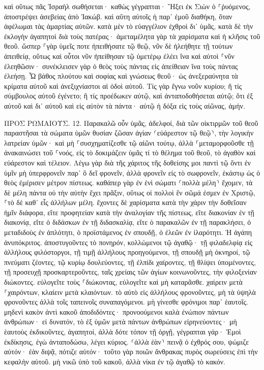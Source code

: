 \documentclass[twoside, 9pt]{extreport}
\begin{document}
καὶ οὕτως πᾶς Ἰσραὴλ σωθήσεται· καθὼς γέγραπται· Ἥξει ἐκ Σιὼν ὁ ⸀ῥυόμενος, ἀποστρέψει ἀσεβείας ἀπὸ Ἰακώβ. 
καὶ αὕτη αὐτοῖς ἡ παρ᾽ ἐμοῦ διαθήκη, ὅταν ἀφέλωμαι τὰς ἁμαρτίας αὐτῶν. 
κατὰ μὲν τὸ εὐαγγέλιον ἐχθροὶ δι᾽ ὑμᾶς, κατὰ δὲ τὴν ἐκλογὴν ἀγαπητοὶ διὰ τοὺς πατέρας· 
ἀμεταμέλητα γὰρ τὰ χαρίσματα καὶ ἡ κλῆσις τοῦ θεοῦ. 
ὥσπερ ⸀γὰρ ὑμεῖς ποτε ἠπειθήσατε τῷ θεῷ, νῦν δὲ ἠλεήθητε τῇ τούτων ἀπειθείᾳ, 
οὕτως καὶ οὗτοι νῦν ἠπείθησαν τῷ ὑμετέρῳ ἐλέει ἵνα καὶ αὐτοὶ ⸀νῦν ἐλεηθῶσιν· 
συνέκλεισεν γὰρ ὁ θεὸς τοὺς πάντας εἰς ἀπείθειαν ἵνα τοὺς πάντας ἐλεήσῃ. 
Ὦ βάθος πλούτου καὶ σοφίας καὶ γνώσεως θεοῦ· ὡς ἀνεξεραύνητα τὰ κρίματα αὐτοῦ καὶ ἀνεξιχνίαστοι αἱ ὁδοὶ αὐτοῦ. 
Τίς γὰρ ἔγνω νοῦν κυρίου; ἢ τίς σύμβουλος αὐτοῦ ἐγένετο; 
ἢ τίς προέδωκεν αὐτῷ, καὶ ἀνταποδοθήσεται αὐτῷ; 
ὅτι ἐξ αὐτοῦ καὶ δι᾽ αὐτοῦ καὶ εἰς αὐτὸν τὰ πάντα· αὐτῷ ἡ δόξα εἰς τοὺς αἰῶνας, ἀμήν. 

ΠΡΟΣ ΡΩΜΑΙΟΥΣ.
12.
Παρακαλῶ οὖν ὑμᾶς, ἀδελφοί, διὰ τῶν οἰκτιρμῶν τοῦ θεοῦ παραστῆσαι τὰ σώματα ὑμῶν θυσίαν ζῶσαν ἁγίαν ⸂εὐάρεστον τῷ θεῷ⸃, τὴν λογικὴν λατρείαν ὑμῶν· 
καὶ μὴ ⸀συσχηματίζεσθε τῷ αἰῶνι τούτῳ, ἀλλὰ ⸀μεταμορφοῦσθε τῇ ἀνακαινώσει τοῦ ⸀νοός, εἰς τὸ δοκιμάζειν ὑμᾶς τί τὸ θέλημα τοῦ θεοῦ, τὸ ἀγαθὸν καὶ εὐάρεστον καὶ τέλειον. 
Λέγω γὰρ διὰ τῆς χάριτος τῆς δοθείσης μοι παντὶ τῷ ὄντι ἐν ὑμῖν μὴ ὑπερφρονεῖν παρ᾽ ὃ δεῖ φρονεῖν, ἀλλὰ φρονεῖν εἰς τὸ σωφρονεῖν, ἑκάστῳ ὡς ὁ θεὸς ἐμέρισεν μέτρον πίστεως. 
καθάπερ γὰρ ἐν ἑνὶ σώματι ⸂πολλὰ μέλη⸃ ἔχομεν, τὰ δὲ μέλη πάντα οὐ τὴν αὐτὴν ἔχει πρᾶξιν, 
οὕτως οἱ πολλοὶ ἓν σῶμά ἐσμεν ἐν Χριστῷ, ⸀τὸ δὲ καθ᾽ εἷς ἀλλήλων μέλη. 
ἔχοντες δὲ χαρίσματα κατὰ τὴν χάριν τὴν δοθεῖσαν ἡμῖν διάφορα, εἴτε προφητείαν κατὰ τὴν ἀναλογίαν τῆς πίστεως, 
εἴτε διακονίαν ἐν τῇ διακονίᾳ, εἴτε ὁ διδάσκων ἐν τῇ διδασκαλίᾳ, 
εἴτε ὁ παρακαλῶν ἐν τῇ παρακλήσει, ὁ μεταδιδοὺς ἐν ἁπλότητι, ὁ προϊστάμενος ἐν σπουδῇ, ὁ ἐλεῶν ἐν ἱλαρότητι. 
Ἡ ἀγάπη ἀνυπόκριτος. ἀποστυγοῦντες τὸ πονηρόν, κολλώμενοι τῷ ἀγαθῷ· 
τῇ φιλαδελφίᾳ εἰς ἀλλήλους φιλόστοργοι, τῇ τιμῇ ἀλλήλους προηγούμενοι, 
τῇ σπουδῇ μὴ ὀκνηροί, τῷ πνεύματι ζέοντες, τῷ κυρίῳ δουλεύοντες, 
τῇ ἐλπίδι χαίροντες, τῇ θλίψει ὑπομένοντες, τῇ προσευχῇ προσκαρτεροῦντες, 
ταῖς χρείαις τῶν ἁγίων κοινωνοῦντες, τὴν φιλοξενίαν διώκοντες. 
εὐλογεῖτε τοὺς ⸀διώκοντας, εὐλογεῖτε καὶ μὴ καταρᾶσθε. 
χαίρειν μετὰ ⸀χαιρόντων, κλαίειν μετὰ κλαιόντων. 
τὸ αὐτὸ εἰς ἀλλήλους φρονοῦντες, μὴ τὰ ὑψηλὰ φρονοῦντες ἀλλὰ τοῖς ταπεινοῖς συναπαγόμενοι. μὴ γίνεσθε φρόνιμοι παρ᾽ ἑαυτοῖς. 
μηδενὶ κακὸν ἀντὶ κακοῦ ἀποδιδόντες· προνοούμενοι καλὰ ἐνώπιον πάντων ἀνθρώπων· 
εἰ δυνατόν, τὸ ἐξ ὑμῶν μετὰ πάντων ἀνθρώπων εἰρηνεύοντες· 
μὴ ἑαυτοὺς ἐκδικοῦντες, ἀγαπητοί, ἀλλὰ δότε τόπον τῇ ὀργῇ, γέγραπται γάρ· Ἐμοὶ ἐκδίκησις, ἐγὼ ἀνταποδώσω, λέγει κύριος. 
⸂ἀλλὰ ἐὰν⸃ πεινᾷ ὁ ἐχθρός σου, ψώμιζε αὐτόν· ἐὰν διψᾷ, πότιζε αὐτόν· τοῦτο γὰρ ποιῶν ἄνθρακας πυρὸς σωρεύσεις ἐπὶ τὴν κεφαλὴν αὐτοῦ. 
μὴ νικῶ ὑπὸ τοῦ κακοῦ, ἀλλὰ νίκα ἐν τῷ ἀγαθῷ τὸ κακόν. 
\end{document}
